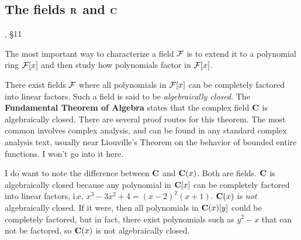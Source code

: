 \begin{comment}

\mysection{Linear Algebra}
\qquad [van der Waerden], Ch. 4, \S6.11 (trace of an field extension)

Determinants; trace.

\end{comment}

\subsection*{\qquad The fields ${\bf R}$ and ${\bf C}$}
, \S11

The most important way to characterize a field ${\cal F}$ is to extend
it to a polynomial ring ${\cal F}[x]$ and then study how polynomials
factor in ${\cal F}[x]$.

There exist fields ${\cal F}$ where all polynomials in ${\cal F}[x]$
can be completely factored into linear factors.  Such a field is said to
be {\it algebraically closed}.  The {\bf Fundamental Theorem of
Algebra} states that the complex field ${\bf C}$ is algebraically
closed.  There are several proof routes for this theorem.  The most
common involves complex analysis, and can be found in any standard
complex analysis text, usually near Liouville's Theorem on the
behavior of bounded entire functions.  I won't go into it here.

I do want to note the difference between ${\bf C}$ and ${\bf C}(x)$.
Both are fields.  ${\bf C}$ is algebraically closed because any
polynomial in ${\bf C}[x]$ can be completely factored into linear
factors, i.e, $x^3-3x^2+4=(x-2)^2(x+1)$.  ${\bf C}(x)$ is {\it not} algebraically closed.
If it were, then all polynomials in ${\bf C}(x)[y]$ could
be completely factored, but in fact, there exist polynomials
such as $y^2-x$ that can not be factored, so ${\bf C}(x)$
is not algebraically closed.

